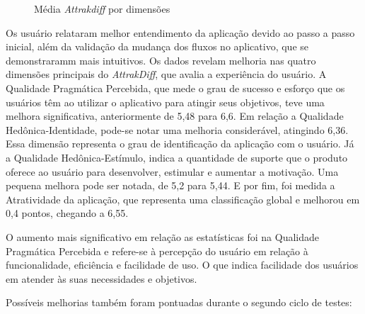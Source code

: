 \begin{figure}[h!]
	\centering
	\caption{Média \textit{Attrakdiff} por dimensões}
	\label{fig27}
\end{figure}

Os usuário relataram melhor entendimento da aplicação devido ao passo a passo inicial, além da validação da mudança dos fluxos no aplicativo, que se demonstraramm mais intuitivos. Os dados revelam melhoria nas quatro dimensões principais do \textit{AttrakDiff}, 
que avalia a experiência do usuário. A Qualidade Pragmática Percebida, que mede o grau de sucesso e esforço que os usuários têm ao utilizar o aplicativo para atingir seus objetivos, teve uma melhora significativa, anteriormente de 5,48 para 6,6. Em relação a 
Qualidade Hedônica-Identidade, pode-se notar uma melhoria considerável, atingindo 6,36. Essa dimensão representa o grau de identificação da aplicação com o usuário. Já a Qualidade Hedônica-Estímulo, indica a quantidade de suporte que o produto oferece ao usuário 
para desenvolver, estimular e aumentar a motivação. Uma pequena melhora pode ser notada, de 5,2 para 5,44. E por fim, foi medida a Atratividade da aplicação, que representa uma classificação global e melhorou em 0,4 pontos, chegando a 6,55.

O aumento mais significativo em relação as estatísticas foi na Qualidade Pragmática Percebida e refere-se à percepção do usuário em relação à funcionalidade, eficiência e facilidade de uso. O que indica facilidade dos usuários em atender às suas necessidades e 
objetivos.

Possíveis melhorias também foram pontuadas durante o segundo ciclo de testes:

